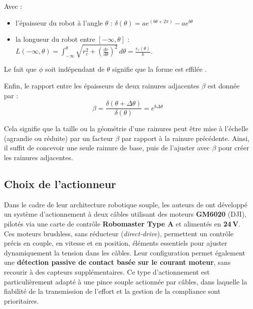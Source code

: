 \documentclass[a4paper, 11pt]{report}
\begin{document}
            Avec :

            \begin{itemize}
                \item l'épaisseur du robot à l'angle $\theta$ : $\delta(\theta) = ae^{(b\theta + 2\pi)} - ae^{b\theta}$
                \item la longueur du robot entre $[-\infty,\theta]$ : $L(-\infty, \theta) = \int_{-\infty}^{\theta} \sqrt{r_c^2 + \left(\frac{dr}{d\theta}\right)^2} \, d\theta = \frac{r_c(\theta)}{b}$.
            \end{itemize}

            Le fait que $\phi$ soit indépendant de $\theta$ signifie que la forme est effilée \cite{wang_spirobs_2025}.

            Enfin, le rapport entre les épaisseurs de deux rainures adjacentes \(\beta\) est donnée par :
            \begin{equation}
            \beta = \frac{\delta(\theta + \Delta\theta)}{\delta(\theta)} = e^{b \Delta\theta}
            \label{eq:beta}
            \end{equation}
            
            Cela signifie que la taille ou la géométrie d’une rainures peut être mise à l’échelle (agrandie ou réduite) par un facteur $\beta$ par rapport à la rainure précédente. Ainsi, il suffit de concevoir une seule rainure de base, puis de l’ajuster avec $\beta$ pour créer les rainures adjacentes.

    \subsection{Choix de l'actionneur}

        Dans le cadre de leur architecture robotique souple, les auteurs de \cite{wang_spirobs_2025} ont développé un système d’actionnement à deux câbles utilisant des moteurs \textbf{GM6020} (DJI), pilotés via une carte de contrôle \textbf{Robomaster Type A} et alimentés en \textbf{24\,V}. Ces moteurs brushless, sans réducteur (\emph{direct-drive}), permettent un contrôle précis en couple, en vitesse et en position, éléments essentiels pour ajuster dynamiquement la tension dans les câbles. Leur configuration permet également une \textbf{détection passive de contact basée sur le courant moteur}, sans recourir à des capteurs supplémentaires. Ce type d’actionnement est particulièrement adapté à une pince souple actionnée par câbles, dans laquelle la fiabilité de la transmission de l’effort et la gestion de la compliance sont prioritaires.
        
\end{document}
